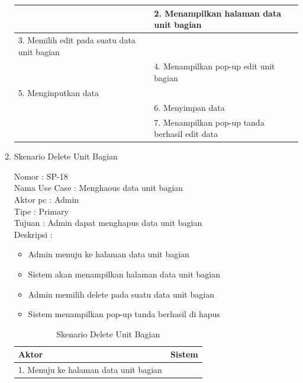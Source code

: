 \begin{enumerate}
\begin{table}
\begin{tabular}{ | p{55mm} | p{70mm} |}
		&  2.	Menampilkan halaman data unit bagian \\
		
		\hline
		
		3. Memilih edit pada suatu data unit bagian & \\
		
		\hline
		
		& 4.	Menampilkan pop-up edit unit bagian \\
		
		\hline
		
		5.	Menginputkan data  & \\
		\hline
		
		& 6.	Menyimpan data \\
		\hline
		
		& 7.	Menampilkan pop-up tanda berhasil edit data \\
		\hline
		
	\end{tabular}
\end{table}

\item Skenario Delete Unit Bagian

Nomor \kern 3.6pc : SP-18 \\
Nama Use Case : Menghaous data unit bagian \\
Aktor  pc : Admin \\
Tipe \kern 4.6pc : Primary \\
Tujuan \kern 3.6pc : Admin dapat menghapus data unit bagian \\
Deskripsi \kern 2.5pc : 

\begin{itemize}
	\item Admin menuju ke halaman data unit bagian
	\item Sistem akan menampilkan halaman data unit bagian
	\item Admin memilih delete pada suatu data unit bagian
	\item Sistem menampilkan pop-up tanda berhasil di hapus
	
\end{itemize}

\begin{table}
	\caption{Skenario Delete Unit Bagian}
	\centering
	\begin{tabular}{ | p{55mm} | p{70mm} |}
		\hline 
		\textbf{Aktor} & \textbf{Sistem} \\
		\hline
		
		1.	Menuju ke halaman data unit bagian &  \\
		

\end{tabular}
\end{table}
\end{enumerate}
